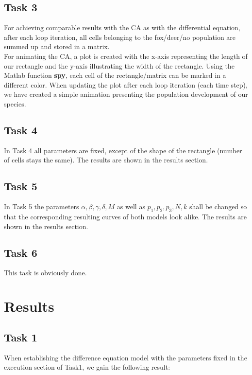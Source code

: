 \documentclass[a4paper,12pt]{article}
\begin{document}
\subsection {Task 3}
For achieving comparable results with the CA as with the differential equation, after each loop iteration, all cells belonging to the fox/deer/no population are summed up and stored in a matrix.\\

For animating the CA, a plot is created with the x-axis representing the length of our rectangle and the y-axis illustrating the width of the rectangle. Using the Matlab function \textbf{spy}, each cell of the rectangle/matrix can be marked in a different color. When updating the plot after each loop iteration (each time step), we have created a simple animation presenting the population development of our species.

\subsection {Task 4}
In Task 4 all parameters are fixed, except of the shape of the rectangle (number of cells stays the same). The results are shown in the results section.
\subsection {Task 5}
In Task 5 the parameters $\alpha,\beta,\gamma,\delta,M$ as well as $p_1, p_2, p_3,N, k$ shall be changed so that the corresponding resulting
curves of both models look alike. The results are shown in the results section.
\subsection {Task 6}
This task is obviously done.

\section{Results}
\subsection {Task 1}
When establishing the difference equation model with the parameters fixed in the execution section of Task1, we gain the following result:\\
\end{document}
